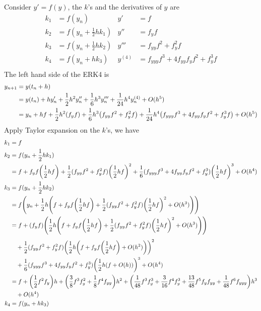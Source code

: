\documentclass[10pt]{report}
\DeclarePairedDelimiter\autoparen{(}{)}
\newcommand{\pa}[1]{\autoparen*{#1}}
\begin{document}
\begin{enumerate}
	Consider $y' = f(y)$, the $k$'s and the derivatives of $y$ are
	\begin{align*}
		k_1 &= f(y_n) & y' &= f\\
		k_2 &= f(y_n + \frac{1}{2}h k_1) & y'' &= f_y f\\
		k_3 &= f(y_n + \frac{1}{2}h k_2) & y''' &= f_{yy} f^2 + f_y^2 f\\
		k_4 &= f(y_n + h k_3) & y^{(4)} &= f_{yyy}f^3 + 4f_{yy} f_y f^2 + f_y^3 f\\
	\end{align*}
	The left hand side of the ERK4 is
	\begin{align*}
	y_{n+1} 
	&= y(t_n+h)\\
	&= y(t_n) + hy_n' + \frac{1}{2}h^2 y_n'' + \frac{1}{6}h^3 y_n''' + \frac{1}{24}h^4 y_n^{(4)} + O(h^5)\\
	&= y_n + hf + \frac{1}{2}h^2\pa{f_y f} + \frac{1}{6}h^3\pa{f_{yy} f^2 + f_y^2 f} + \frac{1}{24}h^4\pa{f_{yyy}f^3 + 4f_{yy} f_y f^2 + f_y^3 f} + O(h^5)
	\end{align*}
	Apply Taylor expansion on the $k$'s, we have
	\begin{align*}
		k_1 &= f\\
		k_2 
		&= f(y_n + \frac{1}{2}hk_1)\\
		&= f + f_yf\pa{\frac{1}{2}hf} + \frac{1}{2}(f_{yy} f^2 + f_y^2 f)\pa{\frac{1}{2}hf}^2 + \frac{1}{6}(f_{yyy}f^3 + 4f_{yy} f_y f^2 + f_y^3)\pa{\frac{1}{2}hf}^3 + O(h^4)\\
		k_3
		&= f(y_n + \frac{1}{2}hk_2)\\
		&= f\pa{y_n + \frac{1}{2}h\pa{f + f_yf\pa{\frac{1}{2}hf} + \frac{1}{2}(f_{yy} f^2 + f_y^2 f)\pa{\frac{1}{2}hf}^2 + O(h^3)}}\\
		&= f + (f_yf)\pa{\frac{1}{2}h\pa{f + f_yf\pa{\frac{1}{2}hf} + \frac{1}{2}(f_{yy} f^2 + f_y^2 f)\pa{\frac{1}{2}hf}^2 + O(h^3)}}
	\end{align*}
	\begin{align*}
		&\quad+ \frac{1}{2}(f_{yy} f^2 + f_y^2 f) \pa{\frac{1}{2}h\pa{f + f_yf\pa{\frac{1}{2}hf} + O(h^2)}}^2\\
		&\quad+ \frac{1}{6}(f_{yyy}f^3 + 4f_{yy} f_y f^2 + f_y^3) \pa{\frac{1}{2}h\pa{f + O(h)}}^3 + O(h^4)\\
		&= f+ \pa{\frac{1}{2}f^2 f_y}h + \pa{\frac{3}{8} f^3 f_y^2 + \frac{1}{8}f^4 f_{yy}}h^2 + \pa{\frac{1}{48}f^3 f_y^3 + \frac{3}{16}f^4 f_y^3 +\frac{13}{48} f^5 f_y f_{yy} + \frac{1}{48} f^6 f_{yyy}} h^3\\
		&\quad+ O(h^4)\\
		k_4
		&= f(y_n + hk_3)\\

\end{align*}
\end{enumerate}
\end{document}
